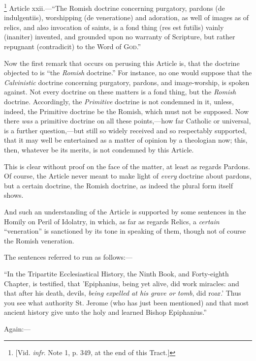 
\footnote{[Vid. \emph{infr}. Note
1, p. 349, at the
end of this Tract.]} Article xxii.—``The
Romish doctrine concerning purgatory, pardons (de indulgentiis),
worshipping (de veneratione) and adoration, as well of images as of
relics, and also invocation of saints, is a fond thing (res est
futilis) vainly (inaniter) invented, and grounded upon no warranty of
Scripture, but rather repugnant (contradicit) to the Word of G\textsc{od}.''

Now the first remark that occurs on perusing this Article is, that
the doctrine objected to is ``the \emph{Romish} doctrine.''
For instance, no one would suppose that the \emph{Calvinistic}
doctrine concerning purgatory, pardons, and image-worship, is spoken
against. Not every doctrine on these matters is a fond thing, but the \emph{Romish}
doctrine. Accordingly, the \emph{Primitive} doctrine is not condemned
in it, unless, indeed, the Primitive doctrine be the Romish, which
must not be supposed. Now there \emph{was} a primitive doctrine on all
these points,—how far Catholic or universal, is a further question,—but
still so widely received and so respectably supported, that it may
well be entertained as a matter of opinion by a theologian now; this,
then, whatever be its merits, is not condemned by this Article.

This is clear without proof on the face of the matter, at least as
regards Pardons. Of course, the Article never meant to make light of \emph{every}
doctrine about pardons, but a certain doctrine, the Romish doctrine,
as indeed the plural form itself shows.

And such an understanding of the Article is supported by some
sentences in the Homily on Peril of Idolatry, in which, as far as
regards Relics, a \emph{certain} ``veneration'' is sanctioned by its tone in speaking of them, though not of course the
Romish veneration.

The sentences referred to run as follows:—

``In the Tripartite Ecclesiastical History, the
Ninth Book, and Forty-eighth Chapter, is testified, that 'Epiphanius,
being yet alive, did work miracles: and that after his death, devils, \emph{being
expelled at his grave or tomb}, did roar.' Thus you see what
authority St. Jerome (who has just been mentioned) and that most
ancient history give unto the holy and learned Bishop Epiphanius.''

Again:—

